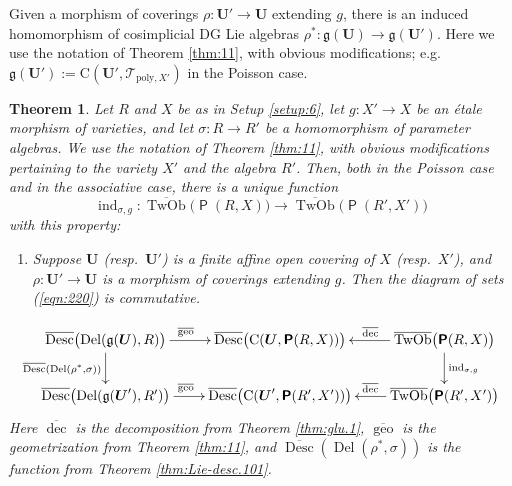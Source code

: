 \documentclass[a4paper, 10pt]{amsart}
\newtheorem{thm}[equation]{Theorem}
\theoremstyle{definition}
\numberwithin{equation}{section}
\newcommand{\opn}{\operatorname}
\newcommand{\cat}[1]{\operatorname{\mathsf{#1}}}
\newcommand{\ol}{\overline}
\newcommand{\rmitem}[1]{\item[\text{\textup{(#1)}}]}
\newcommand{\mfrak}[1]{\mathfrak{#1}}
\newcommand{\mcal}[1]{\mathcal{#1}}
\newcommand{\mrm}[1]{\mathrm{#1}}
\newcommand{\tup}[1]{\textup{#1}}
\newcommand{\bsym}[1]{\boldsymbol{#1}}
\newcommand{\g}{\mfrak{g}}
\newcommand{\si}{\sigma}
\newcommand{\twocat}[1]{\operatorname{\bsym{\cat{#1}}}}
\begin{document}
Given a morphism of coverings
$\rho : \bsym{U}' \to \bsym{U}$ extending $g$, 
there is an induced homomorphism of cosimplicial DG Lie algebras
$\rho^* : \g(\bsym{U}) \to \g(\bsym{U}')$.
Here we use the notation of Theorem \ref{thm:11}, with obvious
modifications; e.g.\ 
$\g(\bsym{U}') := \mrm{C}(\bsym{U}', \mcal{T}_{\mrm{poly}, X'})$
in the Poisson case.

\begin{thm} \label{thm:7}
Let $R$ and $X$ be as in Setup \tup{\ref{setup:6}}, 
let $g : X' \to X$ be an \'etale morphism of varieties, and let 
$\si : R \to R'$ be a homomorphism of parameter algebras.
We use the notation of Theorem
\tup{\ref{thm:11}}, with obvious modifications pertaining to the
variety $X'$ and the algebra $R'$. Then, both in the Poisson case and
in the associative case, there is a unique function
\[ \opn{ind}_{\si, g} : 
\ol{\opn{TwOb}} \bigl( \twocat{P}(R, X) \bigr) \to 
\ol{\opn{TwOb}} \bigl( \twocat{P}(R', X') \bigr)  \]
with this property\tup{:}
\begin{enumerate}
\rmitem{$\lozenge$} Suppose $\bsym{U}$ \tup{(}resp.\ $\bsym{U}'$\tup{)}
is a finite affine open covering of $X$
\tup{(}resp.\ $X'$\tup{)}, and
$\rho : \bsym{U}' \to \bsym{U}$
is a morphism of coverings extending $g$.
Then the diagram of sets \tup{(\ref{eqn:220})} is commutative.
\end{enumerate}

\begin{equation} \label{eqn:220}
\UseTips \xymatrix @C=5ex @R=5ex {
\ol{\opn{Desc}} \bigl( \opn{Del}(\g(\bsym{U}), R) \bigr)
\ar[r]^(0.46){\ol{\opn{geo}}}
\ar[d]_{\ol{\opn{Desc}} (\opn{Del}(\rho^*, \si ))}
& 
\ol{\opn{Desc}} \bigl( \opn{C}(\bsym{U}, \twocat{P}(R, X)) \bigr)
& 
\ol{\opn{TwOb}} \bigl( \twocat{P}(R, X) \bigr) 
\ar[l]_(0.45){\ol{\opn{dec}}}
\ar[d]^{\opn{ind}_{\si, g}} 
\\
\ol{\opn{Desc}} \bigl( \opn{Del}(\g(\bsym{U}'), R') \bigr)
\ar[r]^(0.46){\ol{\opn{geo}}}
& 
\ol{\opn{Desc}} \bigl( \opn{C}(\bsym{U}', \twocat{P}(R', X')) \bigr)
& 
\ol{\opn{TwOb}} \bigl( \twocat{P}(R', X') \bigr) 
\ar[l]_(0.45){\ol{\opn{dec}}}
}
\end{equation}
Here $\ol{\opn{dec}}$ is the decomposition from Theorem \tup{\ref{thm:glu.1}},
$\ol{\opn{geo}}$ is the geometrization from Theorem \tup{\ref{thm:11}}, and 
$\ol{\opn{Desc}} ( \opn{Del}( \rho^*, \si ))$ is the function from Theorem
\tup{\ref{thm:Lie-desc.101}}.
\end{thm}
\end{document}
